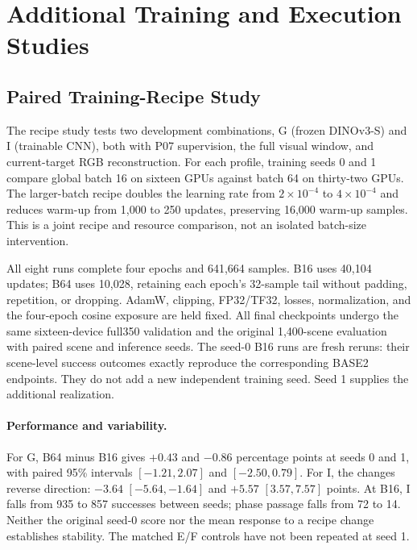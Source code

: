 \section{Additional Training and Execution Studies}
\label{app:additional}

\subsection{Paired Training-Recipe Study}
The recipe study tests two development combinations, G (frozen DINOv3-S)
and I (trainable CNN), both with P07 supervision, the full visual window,
and current-target RGB reconstruction. For each profile, training seeds
0 and 1 compare global batch 16 on sixteen GPUs against batch 64 on
thirty-two GPUs. The larger-batch recipe doubles the learning rate from
$2\!\times\!10^{-4}$ to $4\!\times\!10^{-4}$ and reduces warm-up from 1,000
to 250 updates, preserving 16,000 warm-up samples. This is a joint recipe
and resource comparison, not an isolated batch-size intervention.

All eight runs complete four epochs and 641,664 samples. B16 uses 40,104
updates; B64 uses 10,028, retaining each epoch's 32-sample tail without
padding, repetition, or dropping. AdamW, clipping, FP32/TF32, losses,
normalization, and the four-epoch cosine exposure are held fixed.
All final checkpoints undergo the same sixteen-device full350 validation
and the original 1,400-scene evaluation with paired scene and inference seeds.
The seed-0 B16 runs are fresh reruns: their scene-level success outcomes
exactly reproduce the corresponding BASE2 endpoints. They do not add a new
independent training seed. Seed 1 supplies the additional realization.




\paragraph{Performance and variability.}
For G, B64 minus B16 gives $+0.43$ and $-0.86$ percentage points at seeds
0 and 1, with paired 95\% intervals $[-1.21,2.07]$ and $[-2.50,0.79]$.
For I, the changes reverse direction: $-3.64$ $[-5.64,-1.64]$ and
$+5.57$ $[3.57,7.57]$ points. At B16, I falls from 935 to 857 successes
between seeds; phase passage falls from 72 to 14. Neither the original
seed-0 score nor the mean response to a recipe change establishes stability.
The matched E/F controls have not been repeated at seed 1.

